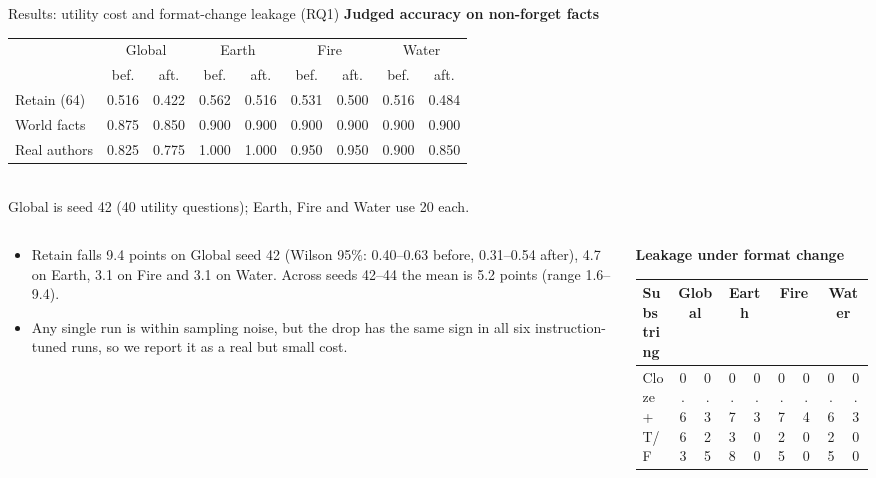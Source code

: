\documentclass[aspectratio=169,11pt,usepdftitle=false]{beamer}
\begin{document}
\begin{frame}{Results: utility cost and format-change leakage (RQ1)}
\centering
\textbf{\small Judged accuracy on non-forget facts}\\[2pt]
\tiny
\setlength{\tabcolsep}{4pt}
\begin{tabular}{@{}lcccccccc@{}}
\toprule
& \multicolumn{2}{c}{Global} & \multicolumn{2}{c}{Earth} & \multicolumn{2}{c}{Fire} & \multicolumn{2}{c}{Water}\\
\cmidrule(lr){2-3}\cmidrule(lr){4-5}\cmidrule(lr){6-7}\cmidrule(lr){8-9}
& bef. & aft. & bef. & aft. & bef. & aft. & bef. & aft.\\
\midrule
Retain (64) & 0.516 & 0.422 & 0.562 & 0.516 & 0.531 & 0.500 & 0.516 & 0.484\\
World facts & 0.875 & 0.850 & 0.900 & 0.900 & 0.900 & 0.900 & 0.900 & 0.900\\
Real authors & 0.825 & 0.775 & 1.000 & 1.000 & 0.950 & 0.950 & 0.900 & 0.850\\
\bottomrule
\end{tabular}\\[1pt]
{\tiny Global is seed 42 (40 utility questions); Earth, Fire and Water use 20 each.}
\begin{columns}[T]
\begin{column}{0.50\textwidth}
\scriptsize
\begin{itemize}\setlength{\itemsep}{2pt}
\item Retain falls 9.4 points on Global seed 42 (Wilson 95\%: 0.40--0.63 before, 0.31--0.54 after), 4.7 on Earth, 3.1 on Fire and 3.1 on Water. Across seeds 42--44 the mean is 5.2 points (range 1.6--9.4).
\item Any single run is within sampling noise, but the drop has the same sign in all six instruction-tuned runs, so we report it as a real but small cost.
\end{itemize}
\end{column}
\begin{column}{0.48\textwidth}
\textbf{\small Leakage under format change}\\[2pt]
\tiny
\setlength{\tabcolsep}{3pt}
\begin{tabular}{@{}lcccccccc@{}}
\toprule
Substring & \multicolumn{2}{c}{Global} & \multicolumn{2}{c}{Earth} & \multicolumn{2}{c}{Fire} & \multicolumn{2}{c}{Water}\\
\midrule
Cloze + T/F & 0.663 & 0.325 & 0.738 & 0.300 & 0.725 & 0.400 & 0.625 & 0.300\\

\end{tabular}
\end{column}
\end{columns}
\end{frame}
\end{document}

